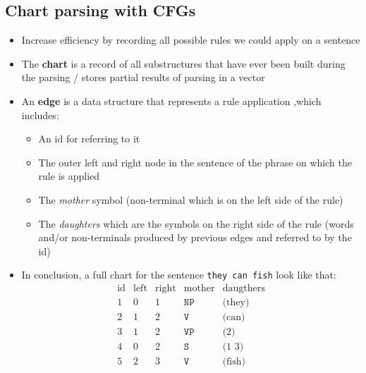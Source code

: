 \subsection{Chart parsing with CFGs}
\begin{itemize}
	\item Increase efficiency by recording all possible rules we could apply on a sentence
	\item The \textbf{chart} is a record of all substructures that have ever been built during the parsing / stores partial results of parsing in a vector
	\item An \textbf{edge} is a data structure that represents a rule application ,which includes:
	\begin{itemize}
		\item An id for referring to it
		\item The outer left and right node in the sentence of the phrase on which the rule is applied
		\item The \textit{mother} symbol (non-terminal which is on the left side of the rule)
		\item The \textit{daughters} which are the symbols on the right side of the rule (words and/or non-terminals produced by previous edges and referred to by the id)
	\end{itemize}
	\item In conclusion, a full chart for the sentence \texttt{they can fish} look like that:
	$$\begin{array}{ccccc}
	\text{id} & \text{left} & \text{right} & \text{mother} & \text{daugthers}\\
	\hline
	1 & 0 & 1 & \texttt{NP} & \text{(they)}\\
	2 & 1 & 2 & \texttt{V} & \text{(can)}\\
	3 & 1 & 2 & \texttt{VP} & \text{(2)}\\
	4 & 0 & 2 & \texttt{S} & \text{(1 3)}\\
	5 & 2 & 3 & \texttt{V} & \text{(fish)}\\

\end{array}$$
\end{itemize}
